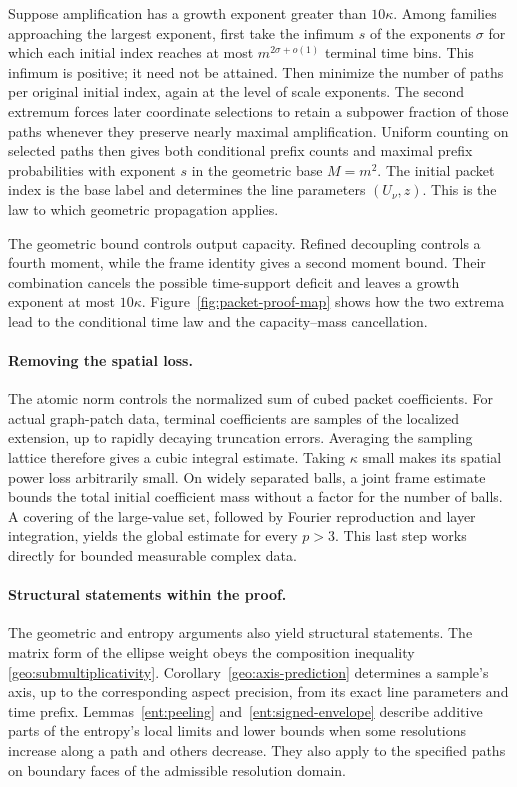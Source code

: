 Suppose amplification has a growth exponent greater than
\(10\kappa\). Among families approaching the largest exponent, first
take the infimum \(s\) of the exponents \(\sigma\) for which each
initial index reaches at most \(m^{2\sigma+o(1)}\) terminal time bins.
This infimum is positive; it need not be attained.
Then minimize the number of paths per original initial index, again
at the level of scale exponents. The second extremum forces later
coordinate selections to retain a subpower fraction of those paths
whenever they preserve nearly maximal amplification. Uniform counting
on selected paths then gives both conditional prefix counts and
maximal prefix probabilities with exponent \(s\) in the geometric base
\(M=m^2\). The initial packet index is the base label and determines
the line parameters \((U_\nu,z)\). This is the law to which geometric
propagation applies.

The geometric bound controls output capacity. Refined decoupling
controls a fourth moment, while the frame identity gives a second
moment bound. Their combination cancels the possible time-support
deficit and leaves a growth exponent at most \(10\kappa\).
Figure~\ref{fig:packet-proof-map} shows how the two extrema lead to
the conditional time law and the capacity--mass cancellation.

\paragraph{Removing the spatial loss.}
The atomic norm controls the normalized sum of cubed packet
coefficients. For actual graph-patch data, terminal coefficients are
samples of the localized extension, up to rapidly decaying truncation
errors. Averaging the sampling lattice therefore gives a cubic
integral estimate. Taking \(\kappa\) small makes its spatial power
loss arbitrarily small. On widely separated balls, a joint frame
estimate bounds the total initial coefficient mass without a factor
for the number of balls.
A covering of the large-value set, followed by Fourier reproduction
and layer integration, yields the global estimate for every \(p>3\).
This last step works directly for bounded measurable complex data.

\paragraph{Structural statements within the proof.}
The geometric and entropy arguments also yield structural statements.
The matrix form of the ellipse weight
obeys the composition inequality \eqref{geo:submultiplicativity}.
Corollary~\ref{geo:axis-prediction} determines a sample's axis, up to
the corresponding aspect precision, from its exact line parameters
and time prefix. Lemmas~\ref{ent:peeling} and~\ref{ent:signed-envelope} describe
additive parts of the entropy's local limits and lower bounds when
some resolutions increase along a path and others decrease. They
also apply to the specified paths on boundary faces of the admissible
resolution domain.

